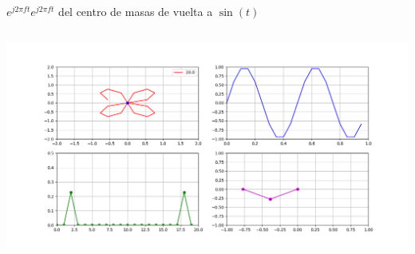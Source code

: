 \begin{frame}{$e^{j2\pi ft}$}{$e^{j2\pi ft}$ del centro de masas de vuelta a $\sin(t)$}
   \handsonicon
   \begin{columns}[onlytextwidth]
      
      
      \centering\includegraphics[width=1.0\textwidth]{2_clase/euler5}
   \end{columns}
   \vfill
\end{frame}

